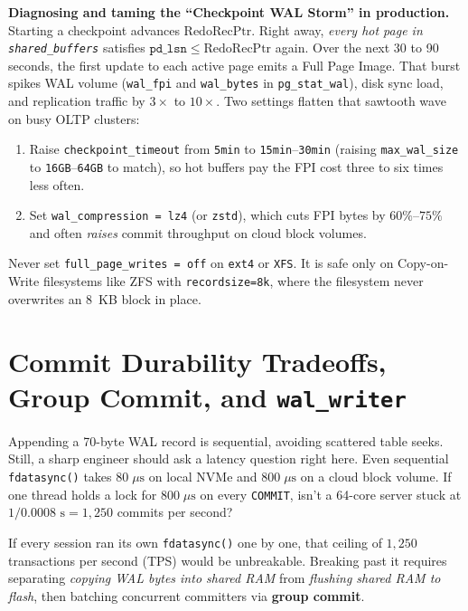 \begin{applicationbox}
\textbf{Diagnosing and taming the ``Checkpoint WAL Storm'' in production.}
Starting a checkpoint advances $\mathrm{RedoRecPtr}$. Right away, \emph{every hot page in \texttt{shared\_buffers}} satisfies $\texttt{pd\_lsn} \le \mathrm{RedoRecPtr}$ again. Over the next 30 to 90 seconds, the first update to each active page emits a Full Page Image. That burst spikes WAL volume (\texttt{wal\_fpi} and \texttt{wal\_bytes} in \texttt{pg\_stat\_wal}), disk sync load, and replication traffic by $3\times$ to $10\times$. Two settings flatten that sawtooth wave on busy OLTP clusters:
\begin{enumerate}
  \item Raise \texttt{checkpoint\_timeout} from \texttt{5min} to \texttt{15min}--\texttt{30min} (raising \texttt{max\_wal\_size} to \texttt{16GB}--\texttt{64GB} to match), so hot buffers pay the FPI cost three to six times less often.
  \item Set \texttt{wal\_compression = lz4} (or \texttt{zstd}), which cuts FPI bytes by $60\%$--$75\%$ and often \emph{raises} commit throughput on cloud block volumes.
\end{enumerate}
Never set \texttt{full\_page\_writes = off} on \texttt{ext4} or \texttt{XFS}. It is safe only on Copy-on-Write filesystems like ZFS with \texttt{recordsize=8k}, where the filesystem never overwrites an 8~KB block in place.
\end{applicationbox}

\section{Commit Durability Tradeoffs, Group Commit, and \texttt{wal\_writer}}
\label{ch04:commit-durability}

Appending a 70-byte WAL record is sequential, avoiding scattered table seeks. Still, a sharp engineer should ask a latency question right here. Even sequential \texttt{fdatasync()} takes $80\;\mu\text{s}$ on local NVMe and $800\;\mu\text{s}$ on a cloud block volume. If one thread holds a lock for $800\;\mu\text{s}$ on every \texttt{COMMIT}, isn't a 64-core server stuck at $1 / 0.0008\text{ s} = 1{,}250$ commits per second?

If every session ran its own \texttt{fdatasync()} one by one, that ceiling of $1{,}250$ transactions per second (TPS) would be unbreakable. Breaking past it requires separating \emph{copying WAL bytes into shared RAM} from \emph{flushing shared RAM to flash}, then batching concurrent committers via \textbf{group commit}.

